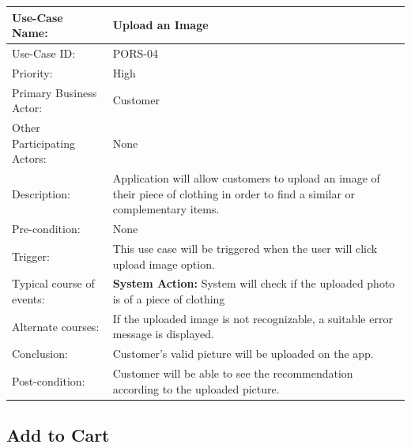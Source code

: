 \begin{center}
    \begin{tabular}{ @{}|p{7cm}||p{7cm}|  }
    \hline
    Use-Case Name: & Upload an Image  \\ \hline
    Use-Case ID: & PORS-04 \\ \hline
    Priority: & High \\ \hline
    Primary Business Actor: & Customer \\ \hline
    Other Participating Actors: & None \\ \hline
    Description: & Application will allow customers to upload an image of their piece of clothing in order to find a similar or complementary items. \\ \hline
    Pre-condition: & None \\ \hline
    Trigger: & This use case will be triggered when the user will click upload image option. \\ \hline
    Typical course of events: & \textbf{System Action:} \newline System will check if the uploaded photo is of a piece of clothing
 \\ \hline
    Alternate courses: & If the uploaded image is not recognizable, a suitable error message is displayed. \\ \hline
    Conclusion: & Customer’s valid picture will be uploaded on the app. \\ \hline
    Post-condition: & Customer will be able to see the recommendation according to the uploaded picture. \\ \hline
    \end{tabular}
\end{center}

\subsection{Add to Cart}

